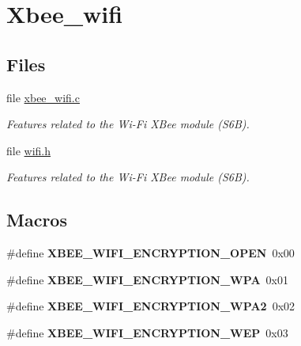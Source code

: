 \hypertarget{group__xbee__wifi}{}\section{Xbee\+\_\+wifi}
\label{group__xbee__wifi}
\subsection*{Files}
\begin{DoxyCompactItemize}
\item 
file \hyperlink{xbee__wifi_8c}{xbee\+\_\+wifi.\+c}
\begin{DoxyCompactList}\small\item\em Features related to the Wi-\/\+Fi X\+Bee module (S6B). \end{DoxyCompactList}\item 
file \hyperlink{wifi_8h}{wifi.\+h}
\begin{DoxyCompactList}\small\item\em Features related to the Wi-\/\+Fi X\+Bee module (S6B). \end{DoxyCompactList}\end{DoxyCompactItemize}
\subsection*{Macros}
\begin{DoxyCompactItemize}
\item 
\mbox{\label{group__xbee__wifi_ga104a5fe57f8926732bec0367054329e9}} 
\#define {\bfseries X\+B\+E\+E\+\_\+\+W\+I\+F\+I\+\_\+\+E\+N\+C\+R\+Y\+P\+T\+I\+O\+N\+\_\+\+O\+P\+EN}~0x00
\item 
\mbox{\label{group__xbee__wifi_ga0f5c18d63177a1d9954d78e23a2ba4ec}} 
\#define {\bfseries X\+B\+E\+E\+\_\+\+W\+I\+F\+I\+\_\+\+E\+N\+C\+R\+Y\+P\+T\+I\+O\+N\+\_\+\+W\+PA}~0x01
\item 
\mbox{\label{group__xbee__wifi_gacc89bffb8885dfdb038788f58ab7e0d6}} 
\#define {\bfseries X\+B\+E\+E\+\_\+\+W\+I\+F\+I\+\_\+\+E\+N\+C\+R\+Y\+P\+T\+I\+O\+N\+\_\+\+W\+P\+A2}~0x02
\item 
\mbox{\label{group__xbee__wifi_ga32639145bf765415024cd31ef7bbda1b}} 
\#define {\bfseries X\+B\+E\+E\+\_\+\+W\+I\+F\+I\+\_\+\+E\+N\+C\+R\+Y\+P\+T\+I\+O\+N\+\_\+\+W\+EP}~0x03
\end{DoxyCompactItemize}
